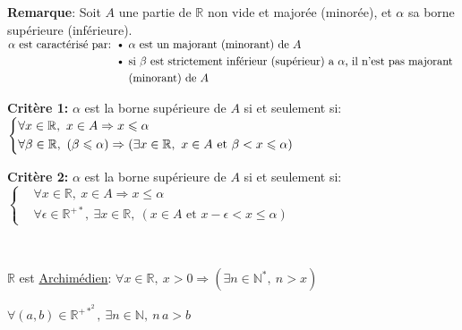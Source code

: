 \documentclass[12pt,twoside,a4paper]{article}
\begin{document}
		\begin{flushleft}
			\textbf{Remarque}: Soit $A$ une partie de $\mathbb{R}$ non vide et major\'ee (minor\'ee), et $\alpha$ sa borne sup\'erieure (inf\'erieure).\\
			$\begin{aligned}
				\alpha\text{ est caract\'eris\'e par: \textbullet\ }&\alpha \text{ est un majorant (minorant) de }A\\
					\text{\textbullet\ }&\text{si }\beta\text{ est strictement inf\'erieur (sup\'erieur) a }\alpha\text{, il n'est pas majorant }\\
					&\text{(minorant) de }A\end{aligned}$
			\begin{liste}
				\item \textbf{Crit\`ere 1:} $\alpha$ est la borne sup\'erieure de $A$ si et seulement si:\\
					$\left\{\begin{aligned}
						&\forall x\in\mathbb{R},\ x\in A\Rightarrow x\leqslant\alpha\\
						&\forall\beta\in\mathbb{R},\ (\beta\leqslant\alpha)\Rightarrow(\exists x\in\R,\ x\in A\text{ et }\beta<x\leqslant\alpha)
					\end{aligned} \right.$
				\item \textbf{Crit\`ere 2:} $\alpha$ est la borne sup\'erieure de $A$ si et seulement si:\\
					$\left\{\begin{aligned}
						&\forall x\in\mathbb{R},\ x\in A\Rightarrow x\leqslant\alpha\\
						&\forall\epsilon\in\mathbb{R}^{+*},\ \exists x\in\mathbb{R},\ (x\in A\text{ et }x-\epsilon<x\leqslant\alpha)
					\end{aligned} \right.$
			\end{liste}\ \\
		\end{flushleft}
		\begin{coro}
			$\mathbb{R}$ est \underline{Archim\'edien}: $\forall x\in\mathbb{R},\ x>0\Rightarrow(\exists n\in\mathbb{N}^*,\ n>x)$
		\end{coro}
		\begin{coro}
			$\forall(a,b)\in\mathbb{R}^{+*^2},\ \exists n\in\mathbb{N},\ n\,a>b$
		\end{coro}
\end{document}

